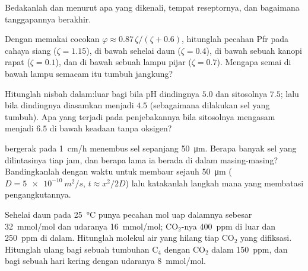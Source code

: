 \begin{exercise}[$\star$]\label{exo:b3:plant-molecular-physiology:4}
Bedakanlah  dan  menurut apa
yang dikenali, tempat reseptornya, dan bagaimana tanggapannya berakhir.
\end{exercise}

\begin{exercise}[$\star\star$]\label{exo:b3:plant-molecular-physiology:5}
Dengan memakai cocokan $\varphi \approx 0.87\,\zeta/(\zeta + 0.6)$, hitunglah
pecahan Pfr pada cahaya siang ($\zeta = 1.15$), di bawah sehelai daun ($\zeta =
0.4$), di bawah sebuah kanopi rapat ($\zeta = 0.1$), dan di bawah sebuah lampu
pijar ($\zeta = 0.7$). Mengapa semai di bawah lampu semacam itu tumbuh jangkung?
\end{exercise}

\begin{exercise}[$\star\star$]\label{exo:b3:plant-molecular-physiology:6}
Hitunglah nisbah dalam:luar bagi  bila pH dindingnya $5.0$ dan
sitosolnya $7.5$; lalu bila dindingnya diasamkan menjadi $4.5$ (sebagaimana dilakukan sel yang
tumbuh). Apa yang terjadi pada penjebakannya bila sitosolnya mengasam menjadi $6.5$
di bawah keadaan tanpa oksigen?
\end{exercise}

\begin{exercise}[$\star\star$]\label{exo:b3:plant-molecular-physiology:7}
 bergerak pada \qty{1}{cm/h} menembus sel sepanjang \qty{50}{\micro m}. Berapa
banyak sel yang dilintasinya tiap jam, dan berapa lama ia berada di dalam masing-masing?
Bandingkanlah dengan waktu untuk membaur sejauh \qty{50}{\micro m} ($D =
\qty{5e-10}{m^2/s}$, $t \approx x^{2}/2D$) lalu katakanlah langkah mana yang membatasi
pengangkutannya.
\end{exercise}

\begin{exercise}[$\star\star$]\label{exo:b3:plant-molecular-physiology:8}
Sehelai daun pada \qty{25}{\celsius} punya pecahan mol uap dalamnya sebesar
\qty{32}{mmol/mol} dan udaranya \qty{16}{mmol/mol}; CO$_{2}$-nya
\qty{400}{ppm} di luar dan \qty{250}{ppm} di dalam. Hitunglah molekul air
yang hilang tiap CO$_{2}$ yang difiksasi. Hitunglah ulang bagi sebuah tumbuhan C$_{4}$ dengan
CO$_{2}$ dalam \qty{150}{ppm}, dan bagi sebuah hari kering dengan udaranya
\qty{8}{mmol/mol}.
\end{exercise}

